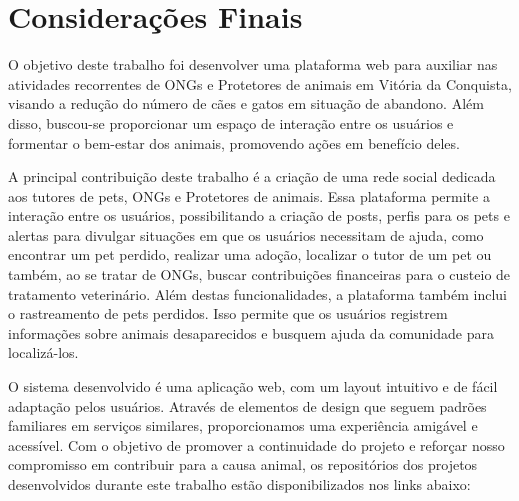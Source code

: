 \chapter{Considerações Finais}
O objetivo deste trabalho foi desenvolver uma plataforma web para auxiliar nas atividades recorrentes de ONGs e Protetores de animais em Vitória da Conquista, visando a redução do número de cães e gatos em situação de abandono. Além disso, buscou-se proporcionar um espaço de interação entre os usuários e formentar o bem-estar dos animais, promovendo ações em benefício deles.

A principal contribuição deste trabalho é a criação de uma rede social dedicada aos tutores de pets, ONGs e Protetores de animais. Essa plataforma permite a interação entre os usuários, possibilitando a criação de posts, perfis para os pets e alertas para divulgar situações em que os usuários necessitam de ajuda, como encontrar um pet perdido, realizar uma adoção, localizar o tutor de um pet ou também, ao se tratar de ONGs, buscar contribuições financeiras para o custeio de tratamento veterinário. Além destas funcionalidades, a plataforma também inclui o rastreamento de pets perdidos. Isso permite que os usuários registrem informações sobre animais desaparecidos e busquem ajuda da comunidade para localizá-los.

O sistema desenvolvido é uma aplicação web, com um layout intuitivo e de fácil adaptação pelos usuários. Através de elementos de design que seguem padrões familiares em serviços similares, proporcionamos uma experiência amigável e acessível.
\newpage
Com o objetivo de promover a continuidade do projeto e reforçar nosso compromisso em contribuir para a causa animal, os repositórios dos projetos desenvolvidos durante este trabalho estão disponibilizados nos links abaixo:


